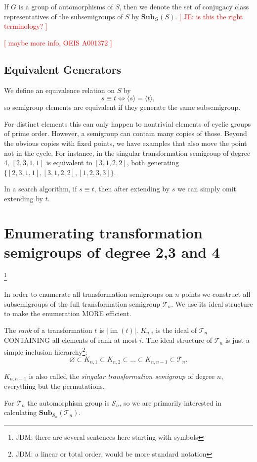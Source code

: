 \documentclass{amsart}
\newcommand{\cT}{{\mathcal T}}
\newcommand{\cS}{{\mathcal S}}
\newcommand{\Sub}{\mathbf{Sub}}
\DeclareMathOperator{\im}{im}
\newcommand{\todo}[1]{\textcolor{red}{ \small \textsf{[ #1 ]} \normalsize}}
\theoremstyle{plain}
\theoremstyle{definition}
\begin{document}
If $G$ is a group of automorphisms of $S$, then we denote the set of conjugacy class representatives of the subsemigroups of $S$ by $\Sub_G(S)$. \todo{JE: is this the right terminology?}

\todo{maybe more info, OEIS A001372}


\subsection{Equivalent Generators}
\label{sec:equivgen}
We define an equivalence relation on $S$ by
$$ s\equiv t \Longleftrightarrow \langle s \rangle= \langle t  \rangle,$$
so semigroup elements are equivalent if they generate the same subsemigroup.

For distinct elements this can only happen to nontrivial elements of cyclic groups of prime order.
However, a semigroup can contain many copies of those.
Beyond the obvious copies with fixed points, we have examples that also move the point not in the cycle. For instance, in the singular transformation semigroup of degree 4, $[ 2, 3, 1, 1 ]$ is equivalent to  $[ 3, 1, 2, 2 ]$, both generating $\{ [ 2, 3, 1, 1 ], [ 3, 1, 2, 2 ], [ 1, 2, 3, 3 ]\}$.

In a search algorithm, if $s\equiv t$, then after extending by $s$ we can simply omit extending by $t$.

\section{Enumerating transformation semigroups of degree 2,3 and 4}
\label{sec:fulltranssgp}\footnote{JDM: there are several sentences here starting
with symbols}

In order to enumerate all transformation semigroups on $n$ points we construct
all subsemigroups of the full transformation semigroup $\cT_n$. We use its ideal
structure to make the enumeration MORE efficient.

The \emph{rank} of a transformation $t$ is $|\im(t)|$. 
$K_{n,i}$ is the ideal of $\cT_n$ CONTAINING all elements of rank at most $i$.
The ideal structure of $\cT_n$ is just a simple inclusion
hierarchy\footnote{JDM: a linear or total order, would be more standard
notation}:
$$\varnothing\subset K_{n,1}\subset K_{n,2}\subset\ldots\subset K_{n,n-1}\subset \cT_n.$$

$K_{n,n-1}$ is also called the \emph{singular transformation semigroup} of degree $n$, everything but the permutations.

 For $\cT_n$ the automorphism group is $\cS_n$, so we are primarily interested in calculating $\Sub_{\cS_n}(\cT_n)$.
\end{document}

